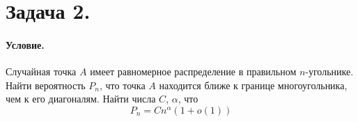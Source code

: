\documentclass{article}
\begin{document}
\begin{comment}
            draw(transf * surface((0, 0, 1/6) -- (1/18, 1/18, 4/18) -- (0, 1/6, 1/6) -- cycle), orange+opacity(.8));
            draw(transf * surface((0, 0, 1/6) -- (1/18, 1/18, 4/18) -- (1/6, 0, 1/6) -- cycle), orange+opacity(.8));
            draw(transf * surface((0, 0, 1/6) -- (1/6, 0, 1/6) -- (0, 1/6, 1/6) -- cycle), orange+opacity(.8));
            draw(transf * surface((0, 1/6, 1/6) -- (1/18, 1/18, 4/18) -- (1/6, 0, 1/6) -- cycle), orange+opacity(.8));
        \end{asy}
    \end{figure}
    Сделав так ещё дважды (с двумя другими тетраэдрами), получим куб со стороной $\frac16$.\\
    Итого объём пересечения всех трёх фигур даст нам $\frac{7}{106}+\frac1{216}=\frac2{27}$.
    \subparagraph{Итоговый объём.}
    $$
    3\cdot\frac{11}{36}-3\cdot\frac{31}{324}+\frac2{27}=\frac{19}{27}
    $$
    Ответ: $\frac{19}{27}$.
    \end{comment}
    \section{Задача 2.}
    \paragraph{Условие.}
    Случайная точка $A$ имеет равномерное распределение в правильном $n$-угольнике. Найти вероятность $P_n$, что точка $A$ находится ближе к границе многоугольника, чем к его диагоналям. Найти числа $C$, $\alpha$, что
    $$
    P_n=Cn^\alpha(1+o(1))
    $$
\end{document}

